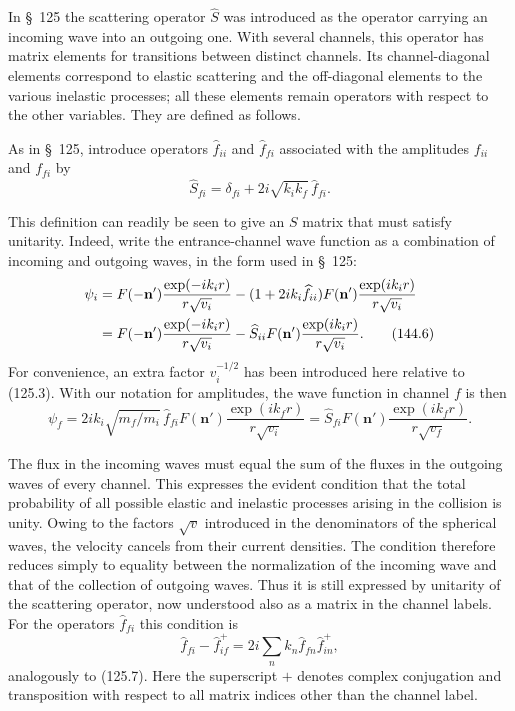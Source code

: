 In \S~125 the scattering operator $\widehat S$ was introduced as the operator carrying an incoming wave into an outgoing one. With several channels, this operator has matrix elements for transitions between distinct channels. Its channel-diagonal elements correspond to elastic scattering and the off-diagonal elements to the various inelastic processes; all these elements remain operators with respect to the other variables. They are defined as follows.

As in \S~125, introduce operators $\widehat f_{ii}$ and $\widehat f_{fi}$ associated with the amplitudes $f_{ii}$ and $f_{fi}$ by
\begin{equation}
 \widehat S_{fi}=\delta_{fi}+2i\sqrt{k_ik_f}\,\widehat f_{fi}.
 \tag{144.5}
\end{equation}

This definition can readily be seen to give an $S$ matrix that must satisfy unitarity. Indeed, write the entrance-channel wave function as a combination of incoming and outgoing waves, in the form used in \S~125:
\begin{align}
 \psi_i&=F(-\mathbf n')\frac{\exp(-ik_i r)}{r\sqrt{v_i}}
 -(1+2ik_i\widehat f_{ii})F(\mathbf n')\frac{\exp(ik_i r)}{r\sqrt{v_i}}\notag\\
 &=F(-\mathbf n')\frac{\exp(-ik_i r)}{r\sqrt{v_i}}
 -\widehat S_{ii}F(\mathbf n')\frac{\exp(ik_i r)}{r\sqrt{v_i}}.
 \tag{144.6}
\end{align}
For convenience, an extra factor $v_i^{-1/2}$ has been introduced here relative to (125.3). With our notation for amplitudes, the wave function in channel $f$ is then
\begin{equation}
 \psi_f=2ik_i\sqrt{m_f/m_i}\,\widehat f_{fi}F(\mathbf n')
 \frac{\exp(ik_f r)}{r\sqrt{v_i}}
 =\widehat S_{fi}F(\mathbf n')\frac{\exp(ik_f r)}{r\sqrt{v_f}}.
 \tag{144.7}
\end{equation}

The flux in the incoming waves must equal the sum of the fluxes in the outgoing waves of every channel. This expresses the evident condition that the total probability of all possible elastic and inelastic processes arising in the collision is unity. Owing to the factors $\sqrt v$ introduced in the denominators of the spherical waves, the velocity cancels from their current densities. The condition therefore reduces simply to equality between the normalization of the incoming wave and that of the collection of outgoing waves. Thus it is still expressed by unitarity of the scattering operator, now understood also as a matrix in the channel labels. For the operators $\widehat f_{fi}$ this condition is
\begin{equation}
 \widehat f_{fi}-\widehat f_{if}^{+}
 =2i\sum_n k_n\widehat f_{fn}\widehat f_{in}^{+},
 \tag{144.8}
\end{equation}
analogously to (125.7). Here the superscript $+$ denotes complex conjugation and transposition with respect to all matrix indices other than the channel label.

